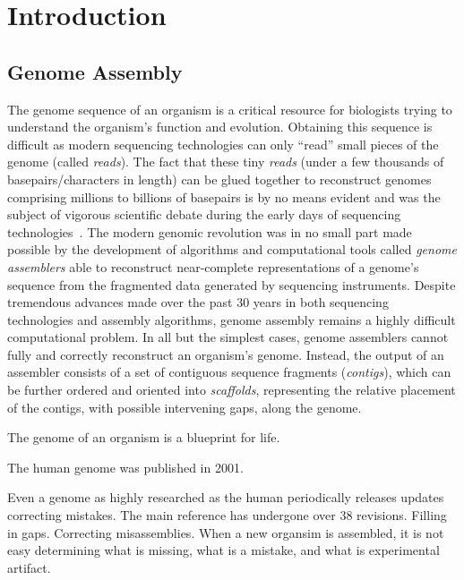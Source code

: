 
\newcommand{\edit}[1]{\textcolor{black}{#1}}

\renewcommand{\thechapter}{1}

\chapter{Introduction}

\section{Genome Assembly}

The genome sequence of an organism is a critical resource for
biologists trying to understand the organism's function and
evolution.  Obtaining this sequence is difficult as modern sequencing
technologies can only ``read'' small pieces of the genome (called
\emph{reads}).  The fact that these tiny \emph{reads} (under a few
thousands of basepairs/characters in length) can be glued together to reconstruct genomes
comprising millions to billions of basepairs is by no means evident
and was the subject of vigorous scientific debate during the early
days of sequencing technologies~\cite{green1997against,weber1997human}. The modern genomic revolution was in no small part made
possible by the development of algorithms and computational tools called
\emph{genome assemblers} able to reconstruct near-complete
representations of a genome's sequence from the fragmented data
generated by sequencing instruments.  Despite tremendous advances made
over the past 30 years in both sequencing technologies and assembly
algorithms, genome assembly remains a highly difficult computational
problem.  In all but the simplest cases, genome assemblers cannot
fully and correctly reconstruct an organism's genome.  Instead, the
output of an assembler consists of a set of contiguous sequence
fragments (\emph{contigs}), which can be further ordered and oriented
into \emph{scaffolds}, representing the relative placement of the
contigs, with possible intervening gaps, along the genome.

The genome of an organism is a blueprint for life.

The human genome was published in 2001.

Even a genome as highly researched as the human periodically releases updates correcting mistakes.
The main reference has undergone over 38 revisions.
Filling in gaps.
Correcting misassemblies.
When a new organsim is assembled, it is not easy determining what is missing, what is a mistake, and what is experimental artifact.


